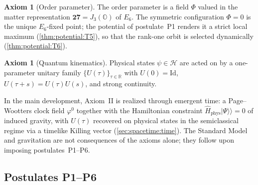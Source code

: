 \documentclass[11pt]{article}
\theoremstyle{plain}
\theoremstyle{definition}
\newtheorem{axiom}[theorem]{Axiom}
\theoremstyle{remark}
\begin{document}
\begin{axiom}[Order parameter]\label{ax:intro:I}
The order parameter is a field $\Phi$ valued in the matter representation
$\mathbf{27}=J_3(\mathbb{O})$ of $E_6$. The symmetric configuration $\Phi=0$ is
the unique $E_6$-fixed point; the potential of postulate~\textnormal{P1} renders
it a strict local maximum (\autoref{thm:potential:T5}), so that the rank-one
orbit is selected dynamically (\autoref{thm:potential:T6}).
\end{axiom}

\begin{axiom}[Quantum kinematics]\label{ax:intro:II}
Physical states $\psi\in\mathcal{H}$ are acted on by a one-parameter unitary
family $\{U(\tau)\}_{\tau\in\mathbb{R}}$ with $U(0)=\mathrm{Id}$,
$U(\tau+s)=U(\tau)U(s)$, and strong continuity.
\end{axiom}

In the main development, Axiom~II is realized through emergent time: a
Page--Wootters clock field $\varphi^{0}$ together with the Hamiltonian constraint
$\hat{H}_{\mathrm{phys}}\lvert\Psi\rangle\!\rangle=0$ of induced gravity, with
$U(\tau)$ recovered on physical states in the semiclassical regime via a timelike
Killing vector (\autoref{sec:spacetime:time}). The Standard Model and
gravitation are not consequences of the axioms alone; they follow upon imposing
postulates~\textnormal{P1--P6}.

\subsection{Postulates \textnormal{P1--P6}}
\label{sec:intro:postulates}
\end{document}
